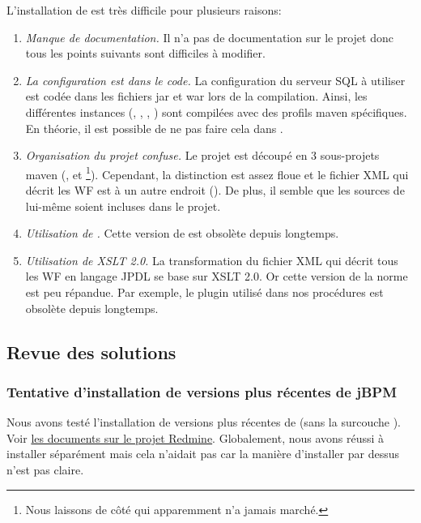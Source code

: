 L'installation de  est très difficile pour plusieurs raisons:
\begin{enumerate}
    \item \emph{Manque de documentation.} Il n'a pas de documentation sur le projet donc tous les points suivants sont difficiles à modifier.
    \item \emph{La configuration est dans le code.} La configuration du serveur SQL à utiliser est codée dans les fichiers jar et war lors de la compilation.
           Ainsi, les différentes instances (, , , ) sont compilées avec des profils maven spécifiques.
           En théorie, il est possible de ne pas faire cela dans .
    \item \emph{Organisation du projet confuse.} Le projet est découpé en 3 sous-projets maven (,  et \footnote{Nous laissons de côté  qui apparemment n'a jamais marché.}).
          Cependant, la distinction est assez floue et le fichier XML qui décrit les WF est à un autre endroit ().
          De plus, il semble que les sources de  lui-même soient incluses dans le projet.
    \item \emph{Utilisation de .} Cette version de  est obsolète depuis longtemps.
    \item \emph{Utilisation de XSLT 2.0.} La transformation du fichier XML qui décrit tous les WF en langage JPDL se base sur XSLT 2.0.
          Or cette version de la norme est peu répandue.
          Par exemple, le plugin  utilisé dans nos procédures est obsolète depuis longtemps.
\end{enumerate}

\subsection{Revue des solutions}

\subsubsection{Tentative d'installation de versions plus récentes de jBPM}

Nous avons testé l'installation de versions plus récentes de  (sans la surcouche ).
Voir \href{https://intranet.genoscope.cns.fr/agc/redmine/documents/88}{les documents sur le projet Redmine}.
Globalement, nous avons réussi à installer  séparément mais cela n'aidait pas
car la manière d'installer  par dessus n'est pas claire.

